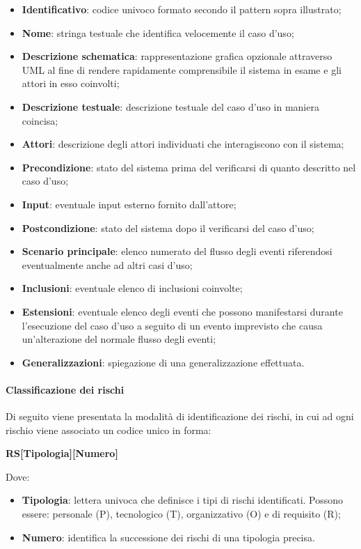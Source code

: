 \begin{itemize}
  \item \textbf{Identificativo}: codice univoco formato secondo il pattern sopra illustrato;
  \item \textbf{Nome}: stringa testuale che identifica velocemente il caso d'uso;
  \item \textbf{Descrizione schematica}: rappresentazione grafica opzionale attraverso UML al fine di rendere rapidamente comprensibile il sistema in esame e gli attori in esso coinvolti;
  \item \textbf{Descrizione testuale}: descrizione testuale del caso d'uso in maniera coincisa;
  \item \textbf{Attori}: descrizione degli attori individuati che interagiscono con il sistema;
  \item \textbf{Precondizione}: stato del sistema prima del verificarsi di quanto descritto nel caso d'uso;
  \item \textbf{Input}: eventuale input esterno fornito dall'attore;
  \item \textbf{Postcondizione}: stato del sistema dopo il verificarsi del caso d'uso;
  \item \textbf{Scenario principale}: elenco numerato del flusso degli eventi riferendosi eventualmente anche ad altri casi d'uso;
  \item \textbf{Inclusioni}: eventuale elenco di inclusioni coinvolte;
  \item \textbf{Estensioni}: eventuale elenco degli eventi che possono manifestarsi durante l'esecuzione del caso d'uso a seguito di un evento imprevisto che causa un'alterazione del normale flusso degli eventi;
  \item \textbf{Generalizzazioni}: spiegazione di una generalizzazione effettuata.
\end{itemize}

\paragraph{Classificazione dei rischi} \label{_classificazioneDeiRischi}
Di seguito viene presentata la modalità di identificazione dei rischi, in cui ad ogni rischio viene associato un codice unico in forma:
\begin{center}
  \textbf{RS[Tipologia][Numero]}
\end{center}
Dove:
\begin{itemize}
  \item \textbf{Tipologia}: lettera univoca che definisce i tipi di rischi identificati.
        \newline Possono essere: personale (P), tecnologico (T), organizzativo (O) e di requisito (R);
  \item \textbf{Numero}: identifica la successione dei rischi di una tipologia precisa.
\end{itemize}

